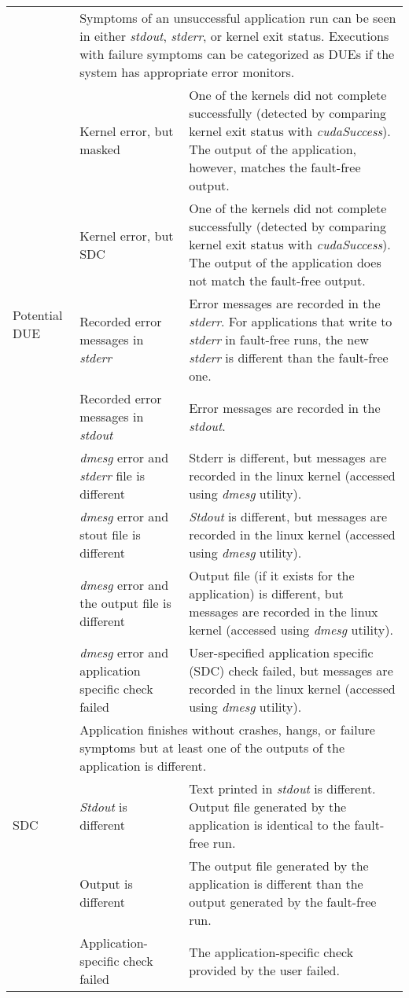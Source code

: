\begin{table}[tbp]
\begin{tabular}{|l|p{3cm}|p{10cm}|}
	\multirow{8}{*}{Potential DUE} & \multicolumn{2}{|p{13cm}|}{Symptoms of an unsuccessful application run can be seen in either {\it stdout}, {\it stderr}, or kernel exit status. Executions with failure symptoms can be categorized as DUEs if the system has appropriate error monitors.} \\
	\cline{2-3}
							& Kernel error, but masked & One of the kernels did not complete successfully (detected by comparing kernel exit status with {\it cudaSuccess}). The output of the application, however, matches the fault-free output. \\ 
	\cline{2-3}
							& Kernel error, but SDC & One of the kernels did not complete successfully (detected by comparing kernel exit status with {\it cudaSuccess}). The output of the application does not match the fault-free output. \\ 
	\cline{2-3}
							& Recorded error messages in {\it stderr} & Error messages are recorded in the {\it stderr}. For applications that write to {\it stderr} in fault-free runs, the new {\it stderr} is different than the fault-free one. \\ 
	\cline{2-3}
							& Recorded error messages in {\it stdout} & Error messages are recorded in the {\it stdout}. \\
	\cline{2-3}
							& {\it dmesg} error and {\it stderr} file is different & Stderr is different, but messages are recorded in the linux kernel (accessed using {\it dmesg} utility). \\
	\cline{2-3}
							& {\it dmesg} error and stout file is different & {\it Stdout} is different, but messages are recorded in the linux kernel (accessed using {\it dmesg} utility). \\
	\cline{2-3}
							& {\it dmesg} error and the output file is different & Output file (if it exists for the application) is different, but messages are recorded in the linux kernel (accessed using {\it dmesg} utility).  \\
	\cline{2-3}
							& {\it dmesg} error and application specific check failed & User-specified application specific (SDC) check failed,  but messages are recorded in the linux kernel (accessed using {\it dmesg} utility). \\
	\hline
	\hline


	\multirow{3}{*}{SDC} & \multicolumn{2}{|p{13cm}|}{Application finishes without crashes, hangs, or failure symptoms but at least one of the outputs of the application is different.} \\ 
	\cline{2-3}
							& {\it Stdout} is different & Text printed in {\it stdout} is different. Output file generated by the application is identical to the fault-free run. \\ 
	\cline{2-3}
							&	Output is different &  The output file generated by the application is different than the output generated by the fault-free run. \\ 
	\cline{2-3}
							&	Application-specific check failed &  The application-specific check provided by the user failed. \\
	\hline 
	\hline
	
\end{tabular}
\end{table}
